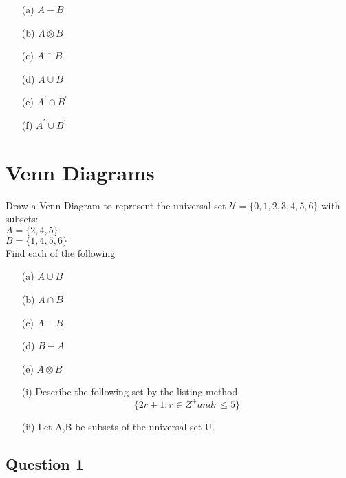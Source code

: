 \documentclass[a4paper,12pt]{article}
\begin{document}
\begin{multicols}{2}
\begin{itemize}
	\item[(a)] $A-B$
	\item[(b)] $A \otimes B$
	\item[(c)] $A \cap B$
	\item[(d)] $A \cup B$
	\item[(e)] $A^{\prime} \cap B^{\prime}$
	\item[(f)] $A^{\prime} \cup B^{\prime}$
\end{itemize}
\end{multicols}

\newpage

\section*{Venn Diagrams}

Draw a Venn Diagram to represent the universal set
$\mathcal{U} = \{0,1,2,3,4,5,6\}$ with subsets:\\
$A = \{2,4,5\}$\\
$B = \{1,4,5,6\}$\\

\noindent Find each of the following
\begin{itemize}
\item[(a)] $A \cup B $
\item[(b)] $A \cap B $
\item[(c)] $A-B$
\item[(d)] $B-A$
\item[(e)] $A \otimes B$
\end{itemize}
\newpage



\begin{itemize}
	\item[(i)] Describe the following set by the listing method
	\[ \{ 2r+1 : r \in Z^{+} and r \leq 5  \} \]
	\item[(ii)] Let A,B be subsets of the universal set U.
	
	
\end{itemize}

\subsection*{Question 1}
\end{document}
